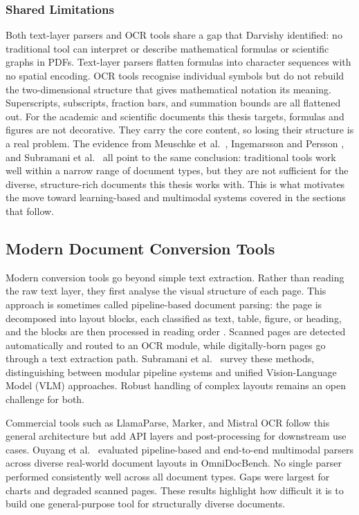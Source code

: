 \documentclass[12pt]{article}
\begin{document}
\subsubsection{Shared Limitations}

Both text-layer parsers and OCR tools share a gap that Darvishy
\cite{darvishy2018} identified: no traditional tool can interpret or describe
mathematical formulas or scientific graphs in PDFs. Text-layer parsers flatten
formulas into character sequences with no spatial encoding. OCR tools recognise
individual symbols but do not rebuild the two-dimensional structure that gives
mathematical notation its meaning. Superscripts, subscripts, fraction bars,
and summation bounds are all flattened out. For the academic and scientific documents
this thesis targets, formulas and figures are not decorative. They carry
the core content, so losing their structure is a real problem. The evidence
from Meuschke et al.\ \cite{meuschke2023}, Ingemarsson and Persson
\cite{ingemarsson2024}, and Subramani et al.\ \cite{subramani2020} all point
to the same conclusion: traditional tools work well within a narrow range of
document types, but they are not sufficient for the diverse, structure-rich
documents this thesis works with. This is what motivates the move toward
learning-based and multimodal systems covered in the sections that follow.

\subsection{Modern Document Conversion Tools}

Modern conversion tools go beyond simple text extraction. Rather than reading the
raw text layer, they first analyse the visual structure of each page. This approach
is sometimes called pipeline-based document parsing: the page is decomposed into
layout blocks, each classified as text, table, figure, or heading, and the blocks
are then processed in reading order \cite{whitington2012}. Scanned pages are detected
automatically and routed to an OCR module, while digitally-born pages go through a
text extraction path. Subramani et al.\ \cite{subramani2020} survey these methods,
distinguishing between modular pipeline systems and unified Vision-Language Model
(VLM) approaches. Robust handling of complex layouts remains an open challenge
for both.

Commercial tools such as LlamaParse, Marker, and Mistral OCR follow this general
architecture but add API layers and post-processing for downstream use cases.
Ouyang et al.\ \cite{omnidocbench2025} evaluated pipeline-based and end-to-end
multimodal parsers across diverse real-world document layouts in OmniDocBench.
No single parser performed consistently well across all document types. Gaps were
largest for charts and degraded scanned pages. These results highlight how
difficult it is to build one general-purpose tool for structurally diverse
documents.
\end{document}
